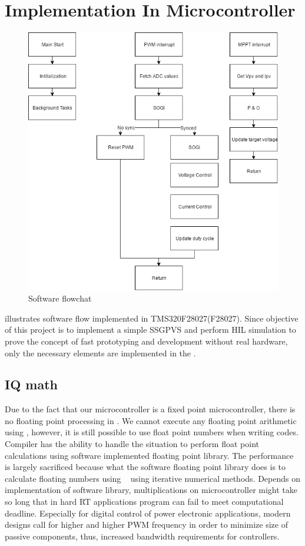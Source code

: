 \section{Implementation In Microcontroller}\label{sec:implement_micro}
\begin{figure}[h]
     \centering
     \includegraphics[width = 1\textwidth]{figures/software_flow}
     \caption{Software flowchat}
     \label{fig:software_flow}
\end{figure}
 illustrates software flow implemented in TMS320F28027(F28027). Since objective of this project is to implement a simple \gls{SSGPVS} and perform \gls{HIL} simulation to prove the concept of fast prototyping and development without real hardware, only the necessary elements are implemented in the \tms. 
\subsection{IQ math}
Due to the fact that our microcontroller is a fixed point microcontroller, there is no floating point processing in \tms. We cannot execute any floating point arithmetic using \tms, however, it is still possible to use float point numbers when writing codes. Compiler has the ability to handle the situation to perform float point calculations using software implemented floating point library. The performance is largely sacrificed because what the software floating point library does is to calculate floating numbers using \fp~ using iterative numerical methods. Depends on implementation of software library, multiplications on microcontroller might take so long that in hard \gls{RT} applications program can fail to meet computational deadline. Especially for digital control of power electronic applications, modern designs call for higher and higher \gls{PWM} frequency in order to minimize size of passive components, thus, increased bandwidth requirements for controllers. 

